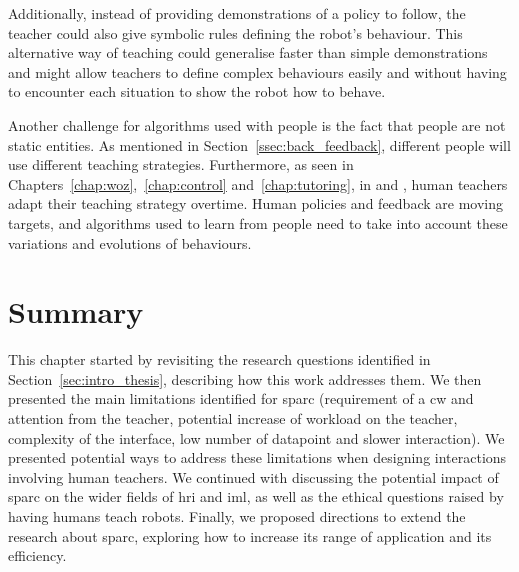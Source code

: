 Additionally, instead of providing demonstrations of a policy to follow, the teacher could also give symbolic rules defining the robot's behaviour. This alternative way of teaching could generalise faster than simple demonstrations and might allow teachers to define complex behaviours easily and without having to encounter each situation to show the robot how to behave. 

Another challenge for algorithms used with people is the fact that people are not static entities. As mentioned in Section~\ref{ssec:back_feedback}, different people will use different teaching strategies. Furthermore, as seen in Chapters~\ref{chap:woz},~\ref{chap:control} and~\ref{chap:tutoring}, in \cite{thomaz2008teachable} and \cite{macglashan2017interactive}, human teachers adapt their teaching strategy overtime. Human policies and feedback are moving targets, and algorithms used to learn from people need to take into account these variations and evolutions of behaviours.

\section{Summary} \label{sec:disc_summary}

This chapter started by revisiting the research questions identified in Section~\ref{sec:intro_thesis}, describing how this work addresses them. We then presented the main limitations identified for \gls{sparc} (requirement of a \gls{cw} and attention from the teacher, potential increase of workload on the teacher, complexity of the interface, low number of datapoint and slower interaction). We presented potential ways to address these limitations when designing interactions involving human teachers. We continued with discussing the potential impact of \gls{sparc} on the wider fields of \gls{hri} and \gls{iml}, as well as the ethical questions raised by having humans teach robots. Finally, we proposed directions to extend the research about \gls{sparc}, exploring how to increase its range of application and its efficiency.